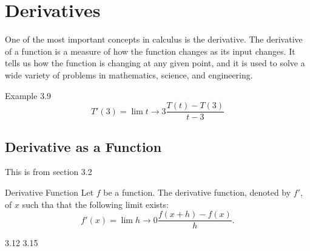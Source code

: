\chapter{Derivatives}
One of the most important concepts in calculus is the derivative. The derivative of a function is a measure of how the function changes as its input changes. It tells us how the function is changing at any given point, and it is used to solve a wide variety of problems in mathematics, science, and engineering.

\begin{example} 
    {Example 3.9}
    \[T'(3)=\lim{t \to 3}\frac{T(t)-T(3)}{t-3}\]
\end{example}

\section{Derivative as a Function}
This is from section 3.2

\begin{definition} 
    {Derivative Function}
    Let \(f\) be a function. The derivative function, denoted by \(f'\), of \(x\) such tha that the following limit exists: 
    \[f'(x)=\lim{h \to 0} \frac{f(x+h)-f(x)}{h}.\]
\end{definition}

3.12
3.15

